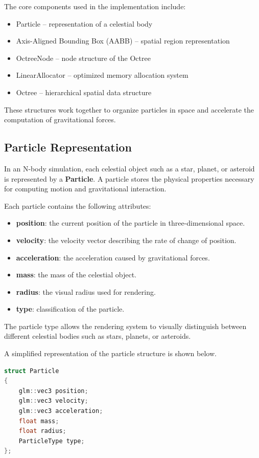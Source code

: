 The core components used in the implementation include:

\begin{itemize}
\item Particle – representation of a celestial body
\item Axis-Aligned Bounding Box (AABB) – spatial region representation
\item OctreeNode – node structure of the Octree
\item LinearAllocator – optimized memory allocation system
\item Octree – hierarchical spatial data structure
\end{itemize}

These structures work together to organize particles in space and accelerate the computation of gravitational forces.

\subsection{Particle Representation}

In an N-body simulation, each celestial object such as a star, planet, or asteroid is represented by a \textbf{Particle}. A particle stores the physical properties necessary for computing motion and gravitational interaction.

Each particle contains the following attributes:

\begin{itemize}
\item \textbf{position}: the current position of the particle in three-dimensional space.
\item \textbf{velocity}: the velocity vector describing the rate of change of position.
\item \textbf{acceleration}: the acceleration caused by gravitational forces.
\item \textbf{mass}: the mass of the celestial object.
\item \textbf{radius}: the visual radius used for rendering.
\item \textbf{type}: classification of the particle.
\end{itemize}

The particle type allows the rendering system to visually distinguish between different celestial bodies such as stars, planets, or asteroids.

A simplified representation of the particle structure is shown below.

\begin{lstlisting}[language=C++]
struct Particle
{
    glm::vec3 position;
    glm::vec3 velocity;
    glm::vec3 acceleration;
    float mass;
    float radius;
    ParticleType type;
};
\end{lstlisting}

